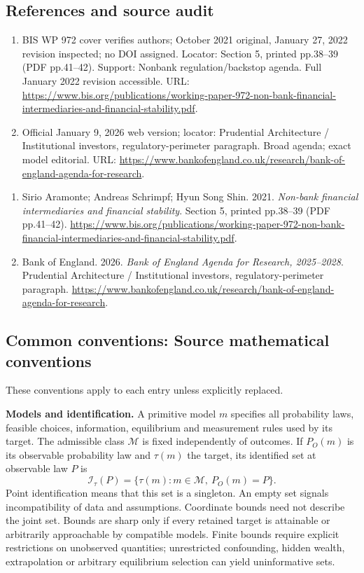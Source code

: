 \documentclass[11pt,a4paper]{article}
\begin{document}
\subsection*{References and source audit}
\begin{enumerate}
\item BIS WP 972 cover verifies authors; October 2021 original, January 27, 2022 revision inspected; no DOI assigned. Locator: Section 5, printed pp.38--39 (PDF pp.41--42). Support: Nonbank regulation/backstop agenda. Full January 2022 revision accessible. URL: \url{https://www.bis.org/publications/working-paper-972-non-bank-financial-intermediaries-and-financial-stability.pdf}.
\item Official January 9, 2026 web version; locator: Prudential Architecture / Institutional investors, regulatory-perimeter paragraph. Broad agenda; exact model editorial. URL: \url{https://www.bankofengland.co.uk/research/bank-of-england-agenda-for-research}.
\end{enumerate}
\begin{enumerate}\raggedright
\item\hypertarget{definitions:source:30007607:1}{} Sirio Aramonte; Andreas Schrimpf; Hyun Song Shin. 2021. \emph{Non-bank financial intermediaries and financial stability}. Section 5, printed pp.38--39 (PDF pp.41--42).
\url{https://www.bis.org/publications/working-paper-972-non-bank-financial-intermediaries-and-financial-stability.pdf}.
\item\hypertarget{definitions:source:30007607:2}{} Bank of England. 2026. \emph{Bank of England Agenda for Research, 2025–2028}. Prudential Architecture / Institutional investors, regulatory-perimeter paragraph.
\url{https://www.bankofengland.co.uk/research/bank-of-england-agenda-for-research}.
\end{enumerate}

\subsection*{Common conventions: Source mathematical conventions}

These conventions apply to each entry unless explicitly replaced.

\textbf{Models and identification.} A primitive model \(m\) specifies all probability laws, feasible choices, information, equilibrium and measurement rules used by its target. The admissible class \(\mathcal M\) is fixed independently of outcomes. If \(P_O(m)\) is its observable probability law and \(\tau(m)\) the target, its identified set at observable law \(P\) is
\[
 \mathcal I_\tau(P)=\{\tau(m):m\in\mathcal M,\ P_O(m)=P\}.
\]
Point identification means that this set is a singleton. An empty set signals incompatibility of data and assumptions. Coordinate bounds need not describe the joint set. Bounds are sharp only if every retained target is attainable or arbitrarily approachable by compatible models. Finite bounds require explicit restrictions on unobserved quantities; unrestricted confounding, hidden wealth, extrapolation or arbitrary equilibrium selection can yield uninformative sets.
\end{document}
